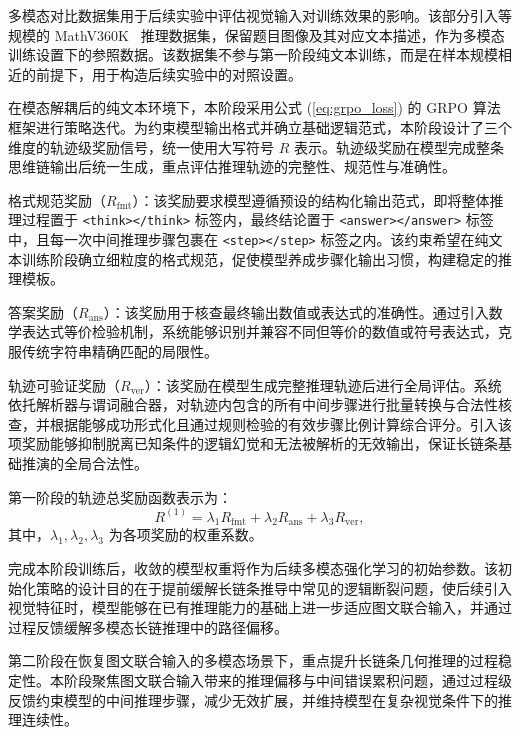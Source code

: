 多模态对比数据集用于后续实验中评估视觉输入对训练效果的影响。该部分引入等规模的 MathV360K~\cite{shi2024mathllava} 推理数据集，保留题目图像及其对应文本描述，作为多模态训练设置下的参照数据。该数据集不参与第一阶段纯文本训练，而是在样本规模相近的前提下，用于构造后续实验中的对照设置。


在模态解耦后的纯文本环境下，本阶段采用公式 (\ref{eq:grpo_loss}) 的 GRPO 算法框架进行策略迭代。为约束模型输出格式并确立基础逻辑范式，本阶段设计了三个维度的轨迹级奖励信号，统一使用大写符号 $R$ 表示。轨迹级奖励在模型完成整条思维链输出后统一生成，重点评估推理轨迹的完整性、规范性与准确性。

格式规范奖励（$R_{\mathrm{fmt}}$）：该奖励要求模型遵循预设的结构化输出范式，即将整体推理过程置于 \texttt{<think></think>} 标签内，最终结论置于 \texttt{<answer></answer>} 标签中，且每一次中间推理步骤包裹在 \texttt{<step></step>} 标签之内。该约束希望在纯文本训练阶段确立细粒度的格式规范，促使模型养成步骤化输出习惯，构建稳定的推理模板。

答案奖励（$R_{\mathrm{ans}}$）：该奖励用于核查最终输出数值或表达式的准确性。通过引入数学表达式等价检验机制，系统能够识别并兼容不同但等价的数值或符号表达式，克服传统字符串精确匹配的局限性。

轨迹可验证奖励（$R_{\mathrm{ver}}$）：该奖励在模型生成完整推理轨迹后进行全局评估。系统依托解析器与谓词融合器，对轨迹内包含的所有中间步骤进行批量转换与合法性核查，并根据能够成功形式化且通过规则检验的有效步骤比例计算综合评分。引入该项奖励能够抑制脱离已知条件的逻辑幻觉和无法被解析的无效输出，保证长链条基础推演的全局合法性。

第一阶段的轨迹总奖励函数表示为：
\begin{equation}
  R^{(1)} = \lambda_1 R_{\mathrm{fmt}} + \lambda_2 R_{\mathrm{ans}} + \lambda_3 R_{\mathrm{ver}},
\end{equation}
其中，$\lambda_1, \lambda_2, \lambda_3$ 为各项奖励的权重系数。

完成本阶段训练后，收敛的模型权重将作为后续多模态强化学习的初始参数。该初始化策略的设计目的在于提前缓解长链条推导中常见的逻辑断裂问题，使后续引入视觉特征时，模型能够在已有推理能力的基础上进一步适应图文联合输入，并通过过程反馈缓解多模态长链推理中的路径偏移。


第二阶段在恢复图文联合输入的多模态场景下，重点提升长链条几何推理的过程稳定性。本阶段聚焦图文联合输入带来的推理偏移与中间错误累积问题，通过过程级反馈约束模型的中间推理步骤，减少无效扩展，并维持模型在复杂视觉条件下的推理连续性。

